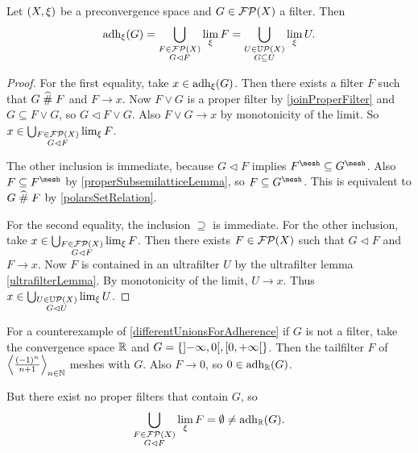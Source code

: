 \begin{proposition} \label{differentUnionsForAdherence}
Let $\sSet{X,\xi}$ be a preconvergence space and $G\in\operatorname{\mathcal{FP}}(X)$ a filter. Then
\[ \operatorname{adh}_\xi(G) = \displaystyle\bigcup_{\substack{F\in\operatorname{\mathcal{FP}}(X) \\ G\lhd F}}\lim_\xi F = \displaystyle\bigcup_{\substack{U\in\operatorname{\mathbb{U}\mathcal{P}}(X) \\ G\subseteq U}}\lim_\xi U. \]
\end{proposition}
\begin{proof}
For the first equality, take $x\in \operatorname{adh}_\xi(G)$. Then there exists a filter $F$ such that $G\mathrel{\widehat{\#}} F$ and $F\to x$.
Now $F\vee G$ is a proper filter by \ref{joinProperFilter} and $G\subseteq F\vee G$, so $G\lhd F\vee G$. Also $F\vee G\to x$ by monotonicity of the limit. So $x\in \bigcup_{\substack{F\in\operatorname{\mathcal{FP}}(X) \\ G\lhd F}}\lim_\xi F$.

The other inclusion is immediate, because $G\lhd F$ implies $F^\mesh \subseteq G^\mesh$. Also $F\subseteq F^\mesh$ by \ref{properSubsemilatticeLemma}, so $F\subseteq G^\mesh$. This is equivalent to $G\mathrel{\widehat{\#}} F$ by \ref{polarsSetRelation}.

For the second equality, the inclusion $\supseteq$ is immediate. For the other inclusion, take $x\in \bigcup_{\substack{F\in\operatorname{\mathcal{FP}}(X) \\ G\lhd F}}\lim_\xi F$. Then there exists $F\in\operatorname{\mathcal{FP}}(X)$ such that $G\lhd F$ and $F\to x$. Now $F$ is contained in an ultrafilter $U$ by the ultrafilter lemma \ref{ultrafilterLemma}. By monotonicity of the limit, $U\to x$. Thus $x\in \bigcup_{\substack{U\in\operatorname{\mathbb{U}\mathcal{P}}(X) \\ G \lhd U}}\lim_\xi U$.
\end{proof}

\begin{example}
For a counterexample of \ref{differentUnionsForAdherence} if $G$ is not a filter, take the convergence space $\mathbb{R}$ and $G = \{\interval[o]{-\infty, 0}, \interval[co]{0,+\infty}\}$. Then the tailfilter $F$ of $\left\langle \frac{(-1)^n}{n+1} \right\rangle_{n\in\mathbb{N}}$ meshes with $G$. Also $F\to 0$, so $0\in \operatorname{adh}_{\mathbb{R}}(G)$.

But there exist no proper filters that contain $G$, so
\[ \bigcup_{\substack{F\in\operatorname{\mathcal{FP}}(X) \\ G\lhd F}}\lim_\xi F = \emptyset \neq \operatorname{adh}_{\mathbb{R}}(G). \]
\end{example}

